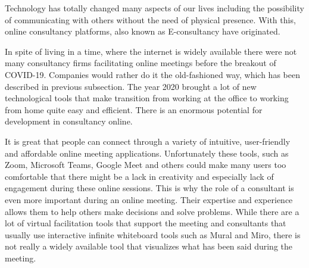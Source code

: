 \documentclass{article}
\begin{document}
{\large
Technology has totally changed many aspects of our lives including the possibility of communicating with others without the need of physical presence. With this, online consultancy platforms, also known as E-consultancy have originated.\par
}

{\large
In spite of living in a time, where the internet is widely available there were not many consultancy firms facilitating online meetings before the breakout of COVID-19. Companies would rather do it the old-fashioned way, which has been described in previous subsection. The year 2020 brought a lot of new technological tools that make transition from working at the office to working from home quite easy and efficient. There is an enormous potential for development in consultancy online.\par
}

{\large
It is great that people can connect through a variety of intuitive, user-friendly and affordable online meeting applications. Unfortunately these tools, such as Zoom, Microsoft Teams, Google Meet and others could make many users too comfortable that there might be a lack in creativity and especially lack of engagement during these online sessions. This is why the role of a consultant is even more important during an online meeting. Their expertise and experience allows them to help others make decisions and solve problems. While there are a lot of virtual facilitation tools that support the meeting and consultants that usually use interactive infinite whiteboard tools such as Mural and Miro, there is not really a widely available tool that visualizes what has been said during the meeting.\par
}
\end{document}
